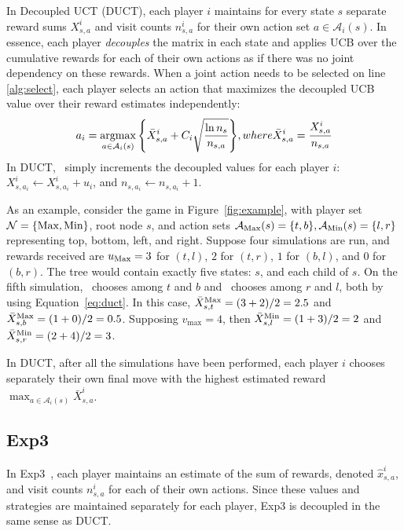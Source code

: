 \documentclass[conference]{IEEEtran}
\newcommand{\argmax}{\operatornamewithlimits{argmax}}
\newcommand{\cA}{\mathcal{A}}
\newcommand{\cN}{\mathcal{N}}
\begin{document}
In Decoupled UCT (DUCT), each player $i$ maintains for every state $s$ separate reward sums $X^i_{s,a}$ and 
visit counts $n^i_{s,a}$ for their own action set $a \in \cA_i(s)$. 
In essence, each player {\it decouples} the matrix in each state and applies UCB over the cumulative rewards for 
each of their own actions as if there was no joint dependency on these rewards.
When a joint action needs to be selected on line 
\ref{alg:select}, each player selects an action that maximizes the decoupled UCB value over their reward estimates 
independently:
\begin{equation}
\label{eq:duct}
a_i = \argmax_{a \in \cA_i(s)}{ \left\{ \bar{X}^i_{s,a} + C_i \sqrt{\frac{\ln n_s}{n_{s,a}}} \right\} }, 
  \mbox{ where } \bar{X}^i_{s,a} = \frac{X^i_{s,a}}{n_{s,a}}
\end{equation}
\noindent In DUCT, \Update~simply increments the decoupled values for each player $i$: $X^i_{s,a_i} \leftarrow X^i_{s,a_i} + u_i$,
and $n_{s,a_i} \leftarrow n_{s,a_i} + 1$. 

As an example, consider the game in Figure~\ref{fig:example}, with player set $\cN = \{\Max,\Min\}$, root node $s$,
and action sets $\cA_{\Max}(s) = \{t,b\}, \cA_{\Min}(s) = \{l,r\}$ representing top, bottom, left, and right. 
Suppose four simulations are run, and rewards received are $u_{\text{Max}} = 3$ for $(t,l)$, $2$ for $(t,r)$, $1$ for $(b,l)$, 
and $0$ for $(b,r)$. The tree would contain exactly five states: $s$, and each child of $s$. On the fifth simulation, 
\Max~chooses among $t$ and $b$ and \Min~chooses among $r$ and $l$, both by using Equation~\ref{eq:duct}. 
In this case, $\bar{X}_{s,t}^{\text{Max}} = (3 + 2) / 2 = 2.5$ and $\bar{X}_{s,b}^{\text{Max}} = (1 + 0) / 2 = 0.5$. 
Supposing $v_{\max} = 4$, then $\bar{X}_{s,l}^{\text{Min}} = (1 + 3) / 2 = 2$ and $\bar{X}^{\text{Min}}_{s,r} = (2 + 4) / 2 = 3$. 

In DUCT, after all the simulations have been performed, each player $i$ chooses separately their own final move 
with the highest estimated reward $\max_{a \in \cA_i(s)} \bar{X}^i_{s,a}$. 

\subsection{Exp3}

In Exp3~\cite{Exp3}, each player maintains an estimate of the sum of rewards, denoted $\hat{x}^i_{s,a}$, and visit 
counts $n^i_{s,a}$ for each of their own actions. 
Since these values and strategies are maintained separately for each player, 
Exp3 is decoupled in the same sense as DUCT. 
\end{document}
